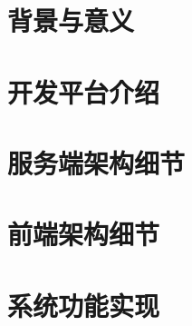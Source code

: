 \documentclass[12pt,a4paper]{article}
\begin{document}
\begin{CJK*}{UTF8}{gbsn}

\renewcommand{\abstractname}{摘要}
\newcommand{\HRule}{\rule{\linewidth}{0.5mm}}
\setcounter{tocdepth}{2}



\begin{spacing}{2.0}
\begin{abstract}
	
\end{abstract}
\end{spacing}

\begin{spacing}{2.0}
\end{spacing}

\begin{spacing}{1.8}
\section{背景与意义}


\section{开发平台介绍}


\section{服务端架构细节}


\section{前端架构细节}


\section{系统功能实现}


% 

% 


\end{spacing}
\end{CJK*}
\end{document}
